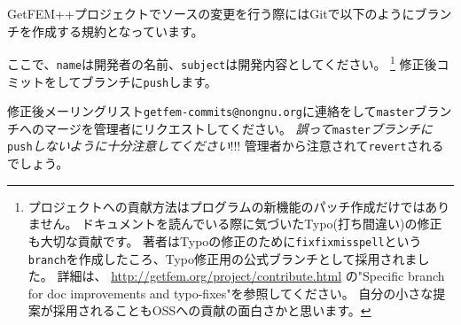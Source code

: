 \documentclass{../../style/ltjoc}
\begin{document}
GetFEM++プロジェクトでソースの変更を行う際にはGitで以下のようにブランチを作成する規約となっています。
\begin{shbox}
\end{shbox}
ここで、\texttt{name}は開発者の名前、\texttt{subject}は開発内容としてください。
\footnote{
プロジェクトへの貢献方法はプログラムの新機能のパッチ作成だけではありません。
ドキュメントを読んでいる際に気づいたTypo(打ち間違い)の修正も大切な貢献です。
著者はTypoの修正のために\texttt{fixfixmisspell}という\texttt{branch}を作成したころ、Typo修正用の公式ブランチとして採用されました。
詳細は、 \href{http://getfem.org/project/contribute.html}{http://getfem.org/project/contribute.html} の"Specific branch for doc improvements and typo-fixes"を参照してください。
自分の小さな提案が採用されることもOSSへの貢献の面白さかと思います。
}
修正後コミットをしてブランチに\texttt{push}します。
\begin{shbox}
\end{shbox}
修正後メーリングリスト\texttt{getfem-commits@nongnu.org}に連絡をして\texttt{master}ブランチへのマージを管理者にリクエストしてください。
\emph{誤って}\texttt{master}\emph{ブランチに}\texttt{push}\emph{しないように十分注意してください}!!!
管理者から注意されて\texttt{revert}されるでしょう。
\end{document}
